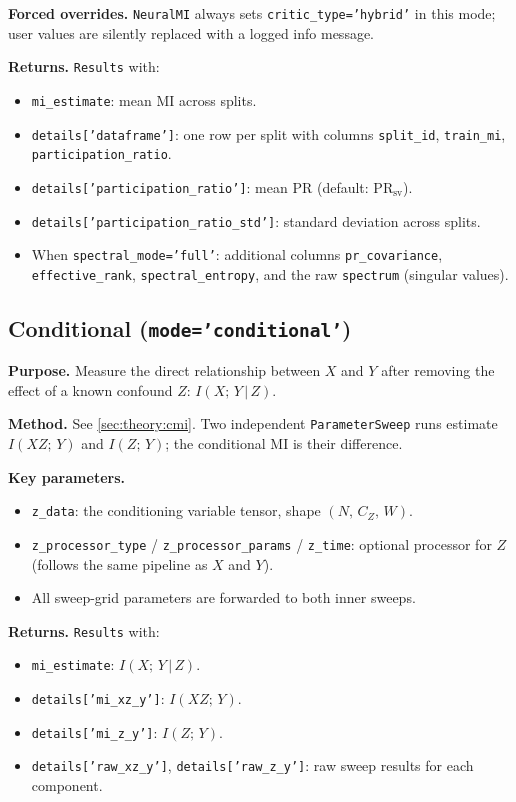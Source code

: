 \documentclass[12pt]{article}
\newcommand{\nmi}{\texttt{NeuralMI}}
\newcommand{\api}[1]{\texttt{#1}}
\begin{document}
\textbf{Forced overrides.}  \nmi{} always sets \api{critic\_type='hybrid'}
in this mode; user values are silently replaced with a logged info message.

\textbf{Returns.}  \api{Results} with:
\begin{itemize}[leftmargin=*]
  \item \api{mi\_estimate}: mean MI across splits.
  \item \api{details['dataframe']}: one row per split with columns
        \api{split\_id}, \api{train\_mi}, \api{participation\_ratio}.
  \item \api{details['participation\_ratio']}: mean PR (default: $\mathrm{PR}_{\mathrm{sv}}$).
  \item \api{details['participation\_ratio\_std']}: standard deviation across splits.
  \item When \api{spectral\_mode='full'}: additional columns
        \api{pr\_covariance}, \api{effective\_rank}, \api{spectral\_entropy},
        and the raw \api{spectrum} (singular values).
\end{itemize}

\subsection{Conditional (\texttt{mode='conditional'})}
\label{sec:modes:conditional}

\textbf{Purpose.}  Measure the direct relationship between $X$ and $Y$
after removing the effect of a known confound $Z$:
$I(X;\,Y\,|\,Z)$.

\textbf{Method.}  See \cref{sec:theory:cmi}.  Two independent
\api{ParameterSweep} runs estimate $I(XZ;\,Y)$ and $I(Z;\,Y)$; the
conditional MI is their difference.

\textbf{Key parameters.}
\begin{itemize}[leftmargin=*]
  \item \api{z\_data}: the conditioning variable tensor, shape
        $(N,\,C_Z,\,W)$.
  \item \api{z\_processor\_type} / \api{z\_processor\_params} /
        \api{z\_time}: optional processor for $Z$ (follows the same
        pipeline as $X$ and $Y$).
  \item All sweep-grid parameters are forwarded to both inner sweeps.
\end{itemize}

\textbf{Returns.}  \api{Results} with:
\begin{itemize}[leftmargin=*]
  \item \api{mi\_estimate}: $I(X;\,Y\,|\,Z)$.
  \item \api{details['mi\_xz\_y']}: $I(XZ;\,Y)$.
  \item \api{details['mi\_z\_y']}: $I(Z;\,Y)$.
  \item \api{details['raw\_xz\_y']}, \api{details['raw\_z\_y']}:
        raw sweep results for each component.
\end{itemize}
\end{document}
